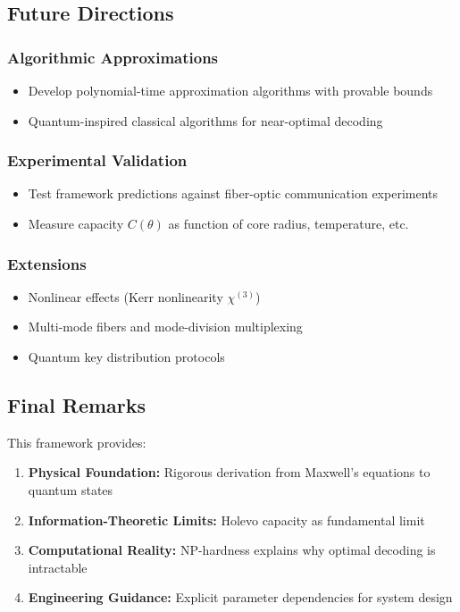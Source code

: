 \documentclass[12pt,a4paper]{article}
\begin{document}
\subsection{Future Directions}

\subsubsection{Algorithmic Approximations}
\begin{itemize}
\item Develop polynomial-time approximation algorithms with provable bounds
\item Quantum-inspired classical algorithms for near-optimal decoding
\end{itemize}

\subsubsection{Experimental Validation}
\begin{itemize}
\item Test framework predictions against fiber-optic communication experiments
\item Measure capacity $C(\theta)$ as function of core radius, temperature, etc.
\end{itemize}

\subsubsection{Extensions}
\begin{itemize}
\item Nonlinear effects (Kerr nonlinearity $\chi^{(3)}$)
\item Multi-mode fibers and mode-division multiplexing
\item Quantum key distribution protocols
\end{itemize}

\subsection{Final Remarks}

This framework provides:
\begin{enumerate}
\item \textbf{Physical Foundation:} Rigorous derivation from Maxwell's equations to quantum states
\item \textbf{Information-Theoretic Limits:} Holevo capacity as fundamental limit
\item \textbf{Computational Reality:} NP-hardness explains why optimal decoding is intractable
\item \textbf{Engineering Guidance:} Explicit parameter dependencies for system design
\end{enumerate}
\end{document}
